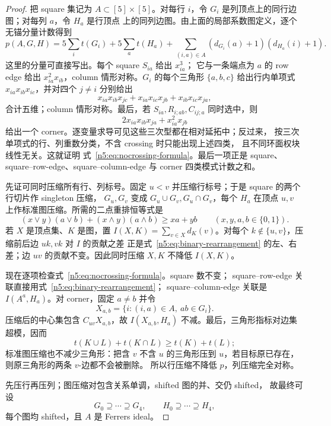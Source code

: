 \begin{proof}
把 square 集记为 \(A\subset[5]\times[5]\)。对每行 \(i\)，令
\(G_i\) 是列顶点上的同行边图；对每列 \(a\)，令 \(H_a\) 是行顶点
上的同列边图。由上面的局部系数图定义，逐个无锚分量计数得到
\begin{equation}\label{n5:eq:nocrossing-formula}
 p(A,G,H)=5\sum_i t(G_i)+5\sum_a t(H_a)
 +\sum_{(i,a)\in A}(d_{G_i}(a)+1)(d_{H_a}(i)+1).
\end{equation}
这里的分量可直接写出。每个 square \(S_{ia}\) 给出 \(x_{ia}^3\)；
它与一条端点为 \(a\) 的 row edge 给出 \(x_{ia}^2x_{ib}\)，column
情形对称。\(G_i\) 的每个三角形 \(\{a,b,c\}\) 给出行内单项式
\(x_{ia}x_{ib}x_{ic}\)，并对四个 \(j\ne i\) 分别给出
\[
x_{ia}x_{ib}x_{jc}+x_{ia}x_{ic}x_{jb}
+x_{ib}x_{ic}x_{ja},
\]
合计五维；column 情形对称。最后，若
\(S_{ia},R_{i;ab},C_{ij;a}\) 同时选中，则
\[
2x_{ia}x_{ib}x_{ja}+x_{ia}^2x_{jb}
\]
给出一个 corner。逐变量求导可见这些三次型都在相对延拓中；反过来，
按三次单项式的行、列重数分类，不含 crossing 时只能出现上述四类，
且不同环面权块线性无关。这就证明
式~\eqref{n5:eq:nocrossing-formula}。最后一项正是 square、
square--row-edge、square--column-edge 与 corner 四类模式计数之和。

先证可同时压缩所有行、列标号。固定 \(u<v\) 并压缩行标号；于是
square 的两个行切片作 singleton 压缩，
\(G_u,G_v\) 变成 \(G_u\cup G_v,G_u\cap G_v\)，每个 \(H_a\)
在顶点 \(u,v\) 上作标准图压缩。所需的二点重排恒等式是
\begin{equation}\label{n5:eq:binary-rearrangement}
 (x\vee y)(a\vee b)+(x\wedge y)(a\wedge b)\ge xa+yb
 \qquad(x,y,a,b\in\{0,1\}).
\end{equation}
若 \(X\) 是顶点集、\(K\) 是图，置
\(I(X,K)=\sum_{v\in X}d_K(v)\)。对每个
\(k\notin\{u,v\}\)，压缩前后边 \(uk,vk\) 对 \(I\) 的贡献之差
正是式~\eqref{n5:eq:binary-rearrangement} 的左、右差；边 \(uv\)
的贡献不变。因此同时压缩 \(X,K\) 不降低 \(I(X,K)\)。

现在逐项检查式~\eqref{n5:eq:nocrossing-formula}。square 数不变；
square--row-edge 关联直接用式~\eqref{n5:eq:binary-rearrangement}；
square--column-edge 关联是 \(I(A^a,H_a)\)。对 corner，固定
\(a\ne b\) 并令
\[
 X_{a,b}=\{i:(i,a)\in A,\ ab\in G_i\}.
\]
压缩后的中心集包含 \(C_{uv}X_{a,b}\)，故
\(I(X_{a,b},H_a)\) 不减。最后，三角形指标对边集超模，因而
\[
 t(K\cup L)+t(K\cap L)\ge t(K)+t(L);
\]
标准图压缩也不减少三角形：把含 \(v\) 不含 \(u\) 的三角形压到
\(u\)，若目标原已存在，则原三角形的两条 \(v\)-边都不会被删除。
所以行压缩不降低 \(p\)，列压缩完全对称。

先压行再压列；图压缩对包含关系单调，shifted 图的并、交仍 shifted，
故最终可设
\[
G_0\supseteq\cdots\supseteq G_4,\qquad
H_0\supseteq\cdots\supseteq H_4,
\]
每个图均 shifted，且 \(A\) 是 Ferrers ideal。


\end{proof}
